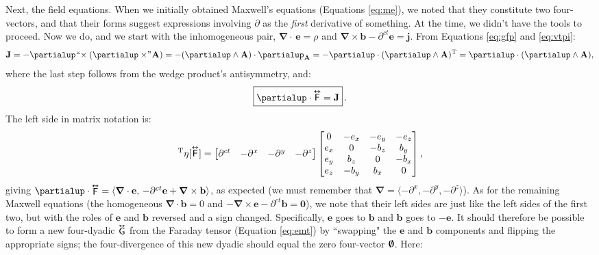 \documentclass[12pt]{article}
\renewcommand{\vv}[1]{\mathbf{#1}}
\newcommand{\del}{\boldsymbol{\nabla}}
\newcommand{\tightoverset}[2]{%
  \mathop{#2}\limits^{\vbox to -.5ex{\kern-0.75ex\hbox{$#1$}\vss}}}
\newcommand{\inlinedy}[1]{\tightoverset{\text{\tiny$\bm\leftrightarrow$}}{#1}}
\newcommand{\capdy}[1]{ \overset{ \text{\tiny$\bm\leftrightarrow$} }{\vphantom{\text{\small{A}}}\smash{#1}} }
\begin{document}
Next, the field equations. When we initially obtained Maxwell's equations (Equations \ref{eq:me}), we noted that they constitute two four-vectors, and that their forms suggest expressions involving $\partialup$ as the \emph{first} derivative of something. At the time, we didn't have the tools to proceed. Now we do, and we start with the inhomogeneous pair, $\del \cdot \, \vv e = \rho$ and ${ \del \times \vv b - \partial^{ct} \vv e = \vv j }$. From Equations \ref{eq:gfp} and \ref{eq:vtpi}:
\begin{equation*}
\vv J = - \partialup \mkern1mu `` \mkern-4mu \times ( \partialup \times \mkern-4mu " \mkern1mu \vv A ) = - ( \partialup \wedge \vv A ) \cdot \partialup_{\vv A} = - \partialup \cdot ( \partialup \wedge \vv A )^\mathrm{T} = \partialup \cdot (\partialup \wedge \vv A),
\end{equation*}
where the last step follows from the wedge product's antisymmetry, and:
\begin{equation}\label{eq:ime}
\boxed{ \vphantom{A_{A_A}} \partialup \cdot \capdy{\mathsf{F}} = \vv J } \, .
\end{equation}
The left side in matrix notation is:
\begin{equation*}
[\partialup]^{\mathrm{T}} \eta [\capdy{\mathsf{F}}]
=
\begin{bmatrix}
\partial^{ct} & - \partial^x & - \partial^y & - \partial^z
\end{bmatrix}
\begin{bmatrix}
0 & -e_x & -e_y & -e_z \\
e_x & 0 & -b_z & b_y \\
e_y & b_z & 0 & -b_x \\
e_z & -b_y & b_x & 0
\end{bmatrix} ,
\end{equation*}
giving $\partialup \cdot \inlinedy{\mathsf{F}} = \langle \del \cdot \vv e , \, - \partial^{ct} \vv e + \del \times \vv b \rangle$, as expected (we must remember that ${\del = \langle - \partial^x , - \partial^y , - \partial^z \rangle}$). As for the remaining Maxwell equations (the homogeneous $\del \cdot \vv b = 0$ and ${ - \del \times \vv e - \partial^{ct} \vv b = \vv 0 }$), we note that their left sides are just like the left sides of the first two, but with the roles of $\vv e$ and $\vv b$ reversed and a sign changed. Specifically, $\vv e$ goes to $\vv b$ and $\vv b$ goes to $- \vv e$. It should therefore be possible to form a new four-dyadic $\inlinedy{\mathsf{G}}$ from the Faraday tensor (Equation \ref{eq:emt}) by ``swapping" the $\vv e$ and $\vv b$ components and flipping the appropriate signs; the four-divergence of this new dyadic should equal the zero four-vector $\textrm{\mbox{\boldmath $\emptyset$}}$. Here:
\end{document}
